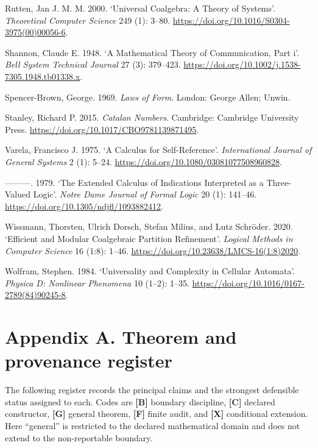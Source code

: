 \documentclass[11pt,a4paper]{article}
\begin{document}
Rutten, Jan J. M. M. 2000. `Universal Coalgebra: A Theory of Systems'.
\emph{Theoretical Computer Science} 249 (1): 3--80.
\url{https://doi.org/10.1016/S0304-3975(00)00056-6}.

Shannon, Claude E. 1948. `A Mathematical Theory of Communication, Part
i'. \emph{Bell System Technical Journal} 27 (3): 379--423.
\url{https://doi.org/10.1002/j.1538-7305.1948.tb01338.x}.

Spencer-Brown, George. 1969. \emph{Laws of Form}. London: George Allen;
Unwin.

Stanley, Richard P. 2015. \emph{Catalan Numbers}. Cambridge: Cambridge
University Press. \url{https://doi.org/10.1017/CBO9781139871495}.

Varela, Francisco J. 1975. `A Calculus for Self-Reference'.
\emph{International Journal of General Systems} 2 (1): 5--24.
\url{https://doi.org/10.1080/03081077508960828}.

---------. 1979. `The Extended Calculus of Indications Interpreted as a
Three-Valued Logic'. \emph{Notre Dame Journal of Formal Logic} 20 (1):
141--46. \url{https://doi.org/10.1305/ndjfl/1093882412}.

Wissmann, Thorsten, Ulrich Dorsch, Stefan Milius, and Lutz Schröder.
2020. `Efficient and Modular Coalgebraic Partition Refinement'.
\emph{Logical Methods in Computer Science} 16 (1:8): 1--46.
\url{https://doi.org/10.23638/LMCS-16(1:8)2020}.

Wolfram, Stephen. 1984. `Universality and Complexity in Cellular
Automata'. \emph{Physica D: Nonlinear Phenomena} 10 (1--2): 1--35.
\url{https://doi.org/10.1016/0167-2789(84)90245-8}.

\section{Appendix A. Theorem and provenance
register}

The following register records the principal claims and the strongest
defensible status assigned to each. Codes are \textbf{{[}B{]}} boundary
discipline, \textbf{{[}C{]}} declared constructor, \textbf{{[}G{]}}
general theorem, \textbf{{[}F{]}} finite audit, and \textbf{{[}X{]}}
conditional extension. Here ``general'' is restricted to the declared
mathematical domain and does not extend to the non-reportable boundary.
\end{document}
